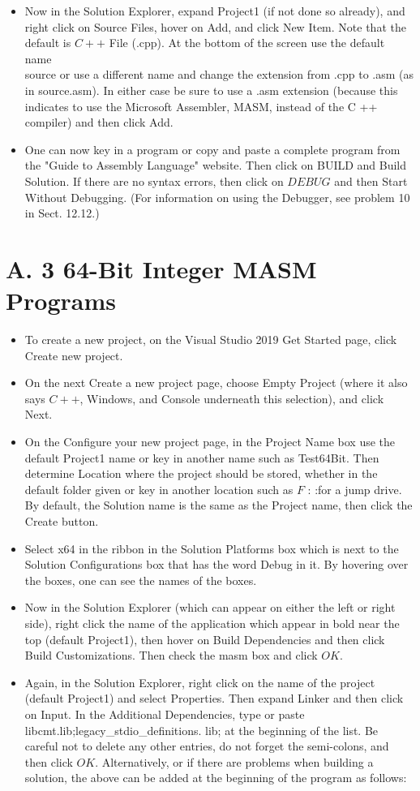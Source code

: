 \documentclass[10pt]{article}
\begin{document}
\begin{itemize}
  \item Now in the Solution Explorer, expand Project1 (if not done so already), and right click on Source Files, hover on Add, and click New Item. Note that the default is $C++$ File (.cpp). At the bottom of the screen use the default name\\
source or use a different name and change the extension from .cpp to .asm (as in source.asm). In either case be sure to use a .asm extension (because this indicates to use the Microsoft Assembler, MASM, instead of the C ++ compiler) and then click Add.
  \item One can now key in a program or copy and paste a complete program from the "Guide to Assembly Language" website. Then click on BUILD and Build Solution. If there are no syntax errors, then click on $D E B U G$ and then Start Without Debugging. (For information on using the Debugger, see problem 10 in Sect. 12.12.)
\end{itemize}

\section*{A. 3 64-Bit Integer MASM Programs}
\begin{itemize}
  \item To create a new project, on the Visual Studio 2019 Get Started page, click Create new project.
  \item On the next Create a new project page, choose Empty Project (where it also says $C++$, Windows, and Console underneath this selection), and click Next.
  \item On the Configure your new project page, in the Project Name box use the default Project1 name or key in another name such as Test64Bit. Then determine Location where the project should be stored, whether in the default folder given or key in another location such as $F$ : :for a jump drive. By default, the Solution name is the same as the Project name, then click the Create button.
  \item Select x64 in the ribbon in the Solution Platforms box which is next to the Solution Configurations box that has the word Debug in it. By hovering over the boxes, one can see the names of the boxes.
  \item Now in the Solution Explorer (which can appear on either the left or right side), right click the name of the application which appear in bold near the top (default Project1), then hover on Build Dependencies and then click Build Customizations. Then check the masm box and click $O K$.
  \item Again, in the Solution Explorer, right click on the name of the project (default Project1) and select Properties. Then expand Linker and then click on Input. In the Additional Dependencies, type or paste libcmt.lib;legacy\_stdio\_definitions. lib; at the beginning of the list. Be careful not to delete any other entries, do not forget the semi-colons, and then click $O K$. Alternatively, or if there are problems when building a solution, the above can be added at the beginning of the program as follows:
\end{itemize}
\end{document}
